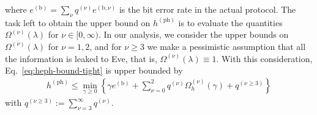 \documentclass[twocolumn,superscriptaddress,pra,footinbib,notitlepage]{revtex4-1}
\newcommand{\1}{\mbox{1}\hspace{-0.25em}\mbox{l}}
\begin{document}
where $e^{(\textrm{b})}=\sum_{\nu}q^{(\nu)}e^{(\textrm{b}, \nu)}$ is the bit error rate in the actual protocol. 
The task left to obtain the upper bound on $h^{(\textrm{ph})}$ is to evaluate the quantities $\Omega^{(\nu)}(\lambda)$ for $\nu\in[0,\infty)$.
In our analysis, we consider the upper bounds on $\Omega^{(\nu)}(\lambda)$ for $\nu=1,2$, and for $\nu\geq3$ we make a pessimistic assumption that all the information is leaked to Eve, that is, $\Omega^{(\nu)}(\lambda)\equiv1$.
With this consideration, Eq.~\eqref{eq:heph-bound-tight} is upper bounded by 
\begin{align}
h^{(\textrm{ph})}\leq\min_{\gamma\geq0}\left\{\gamma e^{(\textrm{b})}+\sum_{\nu=0}^{2}q^{(\nu)}\Omega_h^{(\nu)}(\gamma)+q^{(\nu\geq3)}\right\}
\end{align}
with $q^{(\nu\geq3)}:=\sum_{\nu=3}^{\infty}q^{(\nu)}$.
\end{document}
